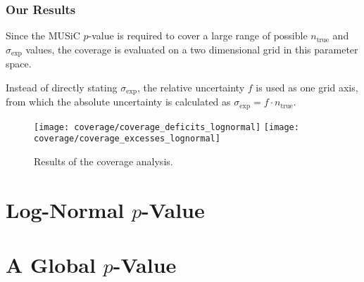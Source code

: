 \subsubsection{Our Results}
Since the MUSiC $p$-value is required to cover a large range of possible $n_\text{true}$ and $\sigma_\text{exp}$ values, the coverage is evaluated on a two dimensional grid in this parameter space.

Instead of directly stating $\sigma_\text{exp}$, the relative uncertainty $f$ is used as one grid axis, from which the absolute uncertainty is calculated as $\sigma_\text{exp} = f \cdot n_\text{true}$. 


\begin{figure}
    \texttt{[image: coverage/coverage\_deficits\_lognormal]}
    \texttt{[image: coverage/coverage\_excesses\_lognormal]}
    \caption{Results of the coverage analysis.}
\end{figure}
\section{Log-Normal $p$-Value}

\section{A Global $p$-Value}
